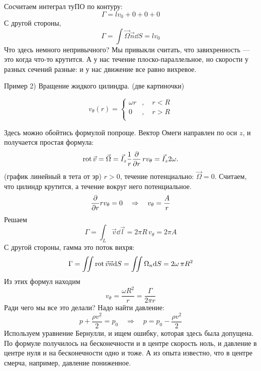 Сосчитаем интеграл туПО по контуру:
\begin{equation}
	\Gamma=lv_0+0+0+0
\end{equation}
С другой стороны,
\begin{equation}
	\Gamma=\int \vec{\Omega}\vec{n}\dd S = lv_0
\end{equation}
Что здесь немного непривычного? Мы привыкли считать, что завихренность  --- это когда что-то крутится. А у нас течение плоско-параллельное, но скорости у разных сечений разные: и у нас движение все равно вихревое.

Пример 2) Вращение жидкого цилиндра. (две картиночки)

\begin{equation}
	v_\theta(r)=\left\{
	\begin{aligned}
		\omega r&, \quad r<R\\
		0&, \quad r>R\\
	\end{aligned}
	\right.
\end{equation}

Здесь можно обойтись формулой попроще. Вектор Омеги направлен по оси $z$, и получается простая формула: 
\begin{equation}
	\operatorname{rot}\vec{v}=
		\vec\Omega=
		\vec{I}_z \frac{1}{r}\pdv{r}\,rv_\theta=
		\vec{I}_z 2\omega.
\end{equation}
(график линейный в тета от эр)
$r>0$, течение потенциально: $\vec{\Omega}=0$. Считаем, что цилиндр крутится, а течение вокруг него потенциальное.
\begin{equation}
 	\pdv{r} rv_\theta=0 \quad \Rightarrow \quad v_\theta=\frac{A}{r}
 \end{equation} 
Решаем
\begin{equation}
	\Gamma=\int_L \vec{v}\dd\vec{l}=2\pi R\, v_\theta= 2\pi A
\end{equation}
С другой стороны, гамма это поток вихря:
\begin{equation}
	\Gamma=\iint \operatorname{rot}\vec{v}\vec{n}\dd S =\iint  \Omega_n \dd S = 2\omega\, \pi R^2
\end{equation}
Из этих формул находим
\begin{equation}
	v_\theta=\frac{\omega R^2}{r}=\frac{\Gamma}{2\pi r}
\end{equation}
Ради чего мы все это делали? Надо найти давление:
\begin{equation}
	p+\frac{\rho v^2}{2}=p_0 \quad \Rightarrow \quad
	p=p_0-\frac{\rho v^2}{2}
\end{equation}
Используем уравнение Бернулли, и ищем ошибку, которая здесь была допущена. По формуле получилось на бесконечности и в центре скорость ноль, и давление в центре нуля и на бесконечности одно и тоже. А из опыта известно, что в центре смерча, например, давление пониженное.

